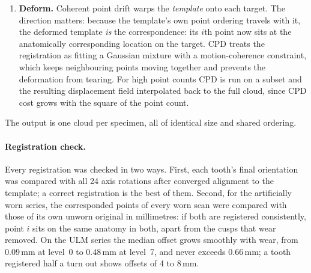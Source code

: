 \documentclass[10pt,a4paper,twocolumn]{article}
\newcommand{\mm}{\,\mathrm{mm}}
\begin{document}
\begin{enumerate}
        central specimen in the sample so that no tooth is privileged by an
        arbitrary choice of reference.
  \item \textbf{Deform.} Coherent point drift \citep{myronenko2010cpd} warps the
        \emph{template} onto each target. The direction matters: because the
        template's own point ordering travels with it, the deformed template
        \emph{is} the correspondence: its $i$th point now sits at the
        anatomically corresponding location on the target. CPD treats the
        registration as fitting a Gaussian mixture with a motion-coherence
        constraint, which keeps neighbouring points moving together and prevents
        the deformation from tearing. For high point counts CPD is run on a
        subset and the resulting displacement field interpolated back to the full
        cloud, since CPD cost grows with the square of the point count.
\end{enumerate}

The output is one cloud per specimen, all of identical size and shared ordering.

\paragraph{Registration check.}
\label{sec:regcheck}
Every registration was checked in two ways. First, each tooth's final
orientation was compared with all 24 axis rotations after converged alignment to
the template; a correct registration is the best of them. Second, for the
artificially worn series, the corresponded points of every worn scan were
compared with those of its own unworn original in millimetres: if both are
registered consistently, point $i$ sits on the same anatomy in both, apart from
the cusps that wear removed. On the ULM series the median offset grows smoothly
with wear, from $0.09\mm$ at level~0 to $0.48\mm$ at level~7, and never
exceeds $0.66\mm$; a tooth registered half a turn out shows offsets of 4 to
$8\mm$.
\end{document}
